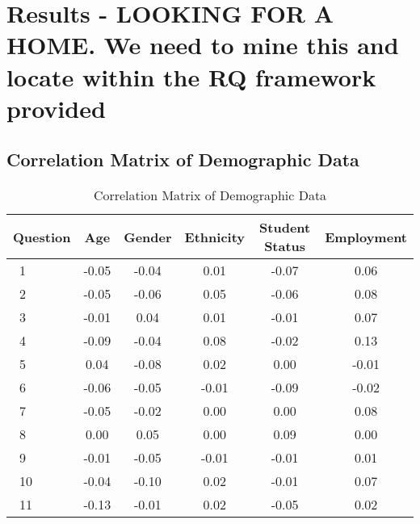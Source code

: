 \section{Results - LOOKING FOR A HOME. We need to mine this and locate within the RQ framework provided}

\subsection{Correlation Matrix of Demographic Data}

\begin{table*}[htb]
    \centering
    \begin{tabular}{@{}lc|cc|cc@{}}
     \textbf{Question} & \textbf{Age} &
     \textbf{Gender} &\textbf{Ethnicity} &
     \textbf{Student Status} & \textbf{Employment}
     \\\hline
     \ 1 &-0.05 &	-0.04 &	0.01 &	-0.07	& 0.06
     \\\hline

     \ 2 & -0.05	 &-0.06	 & 0.05	& -0.06 & 	0.08 
     \\\hline
     
     \ 3 &  -0.01	& 0.04	& 0.01	& -0.01 &	0.07
     \\\hline
     
     \ 4 & -0.09 &	-0.04 &	0.08 &	-0.02 &	0.13 
     \\\hline
     
    \ 5 & 0.04 &	-0.08 &	0.02 &	0.00 &	-0.01
    \\\hline

    \ 6 & -0.06	& -0.05&	-0.01&	-0.09&	-0.02
    \\\hline

    \ 7 & -0.05&	-0.02&	0.00&	0.00&	0.08
    \\\hline
    
    \ 8 & 0.00	&0.05 &	0.00 &	0.09 &	0.00
\\\hline
    \ 9 & -0.01	& -0.05	& -0.01	& -0.01 &	0.01
    \\\hline
     \ 10 & -0.04	&-0.10 &	0.02&	-0.01 &	0.07
    \\\hline 
    \ 11 & -0.13	&-0.01	&0.02&	-0.05&	0.02
    \\\hline
    \end{tabular}
    \caption{Correlation Matrix of Demographic Data}
    \label{table:caseF1}
\end{table*}

